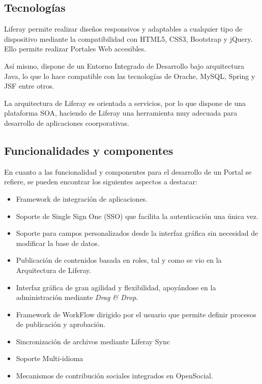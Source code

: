 \subsection{Tecnologías}
\par Liferay permite realizar diseños responsivos y adaptables a cualquier tipo de dispositivo mediante la compatibilidad con HTML5, CSS3, Bootstrap y jQuery. Ello permite realizar Portales Web accesibles.
\par Así mismo, dispone de un Entorno Integrado de Desarrollo bajo arquitectura Java, lo que lo hace compatible con las tecnologías de Orache, MySQL, Spring y JSF entre otros.
\par La arquitectura de Liferay es orientada a servicios, por lo que dispone de una plataforma SOA, haciendo de Liferay una herramienta muy adecuada para desarrollo de aplicaciones coorporativas.
\subsection{Funcionalidades y componentes}
\par En cuanto a las funcionalidad y componentes para el desarrollo de un Portal se refiere, se pueden encontrar los siguientes aspectos a destacar:
\begin{itemize}
    \item Framework de integración de aplicaciones.
    \item Soporte de Single Sign One (SSO) que facilita la autenticación una única vez.
    \item Soporte para campos personalizados desde la interfaz gráfica sin necesidad de modificar la base de datos.
    \item Publicación de contenidos basada en roles, tal y como se vio en la Arquitectura de Liferay.
    \item Interfaz gráfica de gran agilidad y flexibilidad, apoyándose en la administración mediante \textit{Drag \& Drop}.
    \item Framework de WorkFlow dirigido por el usuario que permite definir procesos de publicación y aprobación.
    \item Sincronización de archivos mediante Liferay Sync
    \item Soporte Multi-idioma
    \item Mecanismos de contribución sociales integrados en OpenSocial.
\end{itemize}

